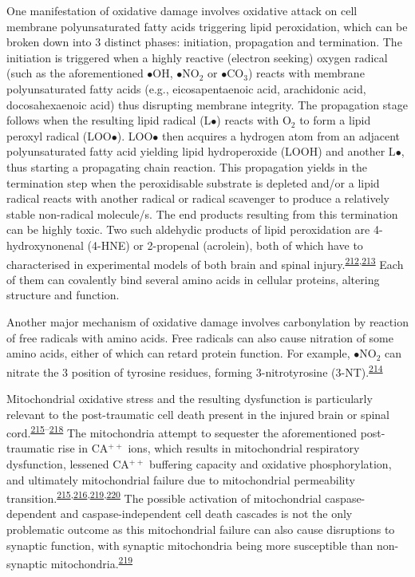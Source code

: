 \documentclass[
]{article}
\begin{document}
One manifestation of oxidative damage involves oxidative attack on cell membrane polyunsaturated fatty acids triggering lipid peroxidation, which can be broken down into 3 distinct phases: initiation, propagation and termination.
The initiation is triggered when a highly reactive (electron seeking) oxygen radical (such as the aforementioned \(\bullet\)OH, \(\bullet\)NO\(_2\) or \(\bullet\)CO\(_3\)) reacts with membrane polyunsaturated fatty acids (e.g., eicosapentaenoic acid, arachidonic acid, docosahexaenoic acid) thus disrupting membrane integrity.
The propagation stage follows when the resulting lipid radical (L\(\bullet\)) reacts with O\(_2\) to form a lipid peroxyl radical (LOO\(\bullet\)).
LOO\(\bullet\) then acquires a hydrogen atom from an adjacent polyunsaturated fatty acid yielding lipid hydroperoxide (LOOH) and another L\(\bullet\), thus starting a propagating chain reaction.
This propagation yields in the termination step when the peroxidisable substrate is depleted and/or a lipid radical reacts with another radical or radical scavenger to produce a relatively stable non-radical molecule/s.
The end products resulting from this termination can be highly toxic.
Two such aldehydic products of lipid peroxidation are 4-hydroxynonenal (4-HNE) or 2-propenal (acrolein), both of which have to characterised in experimental models of both brain and spinal injury.\textsuperscript{\protect\hyperlink{ref-bains_antioxidant_2012}{212},\protect\hyperlink{ref-hamann_acrolein_2009}{213}}
Each of them can covalently bind several amino acids in cellular proteins, altering structure and function.

Another major mechanism of oxidative damage involves carbonylation by reaction of free radicals with amino acids.
Free radicals can also cause nitration of some amino acids, either of which can retard protein function.
For example, \(\bullet\)NO\(_2\) can nitrate the 3 position of tyrosine residues, forming 3-nitrotyrosine (3-NT).\textsuperscript{\protect\hyperlink{ref-mustafa_mitochondrial_2010}{214}}

Mitochondrial oxidative stress and the resulting dysfunction is particularly relevant to the post-traumatic cell death present in the injured brain or spinal cord.\textsuperscript{\protect\hyperlink{ref-lifshitz_structural_2003}{215}--\protect\hyperlink{ref-sullivan_temporal_2007}{218}}
The mitochondria attempt to sequester the aforementioned post-traumatic rise in CA\(^{++}\) ions, which results in mitochondrial respiratory dysfunction, lessened CA\(^{++}\) buffering capacity and oxidative phosphorylation, and ultimately mitochondrial failure due to mitochondrial permeability transition.\textsuperscript{\protect\hyperlink{ref-lifshitz_structural_2003}{215},\protect\hyperlink{ref-singh_time_2006}{216},\protect\hyperlink{ref-sullivan_traumatic_1998}{219},\protect\hyperlink{ref-sullivan_mitochondrial_2005}{220}}
The possible activation of mitochondrial caspase-dependent and caspase-independent cell death cascades is not the only problematic outcome as this mitochondrial failure can also cause disruptions to synaptic function, with synaptic mitochondria being more susceptible than non-synaptic mitochondria.\textsuperscript{\protect\hyperlink{ref-sullivan_traumatic_1998}{219}}
\end{document}
